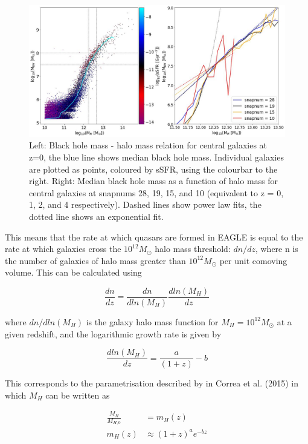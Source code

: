 \documentclass[12pt, twocolumn]{revtex4}    %
\begin{document}
\begin{figure}[H]
\centering
\includegraphics[width=17cm]{Plot_3.jpeg}
\caption{Left: Black hole mass - halo mass relation for central galaxies at z=0, the blue line shows median black hole mass. Individual galaxies are plotted as points, coloured by sSFR, using the colourbar to the right. Right: Median black hole mass as a function of halo mass for central galaxies at snapnums 28, 19, 15, and 10 (equivalent to z = 0, 1, 2, and 4 respectively). Dashed lines show power law fits, the dotted line shows an exponential fit.}
\label{fig:4}
\end{figure}
\twocolumngrid


This means that the rate at which quasars are formed in EAGLE is equal to the rate at which galaxies cross the $10^{12}M_\odot$ halo mass threshold: $dn/dz$, where n is the number of galaxies of halo mass greater than $10^{12}M_\odot$ per unit comoving volume. This can be calculated using \cite{Correa}

\begin{equation}
    \frac{dn}{dz}=\frac{dn}{dln(M_H)}\frac{dln(M_H)}{dz}
\end{equation}

\noindent where $dn/dln(M_H)$ is the galaxy halo mass function for $M_H=10^{12}M_\odot$ at a given redshift, and the logarithmic growth rate is given by

\begin{equation}
    \frac{dln(M_H)}{dz}=\frac{a}{(1+z)}-b
\end{equation}

\noindent This corresponds to the parametrisation described by in Correa et al. (2015) in which $M_H$ can be written as

\begin{align}
    \frac{M_H}{M_{H,0}}&=m_H(z) \nonumber \\
    m_H(z)&\approx(1+z)^ae^{-bz}
\end{align}
\end{document}
